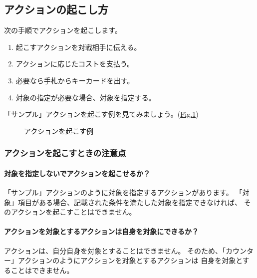 \documentclass[letterpaper,10pt,dvipdfmx]{sphinxmanual}
\begin{document}
\subsection{アクションの起こし方}
\label{\detokenize{common/common:id20}}
\sphinxAtStartPar
次の手順でアクションを起こします。
\begin{enumerate}
%
\item {} 
\sphinxAtStartPar
起こすアクションを対戦相手に伝える。

\item {} 
\sphinxAtStartPar
アクションに応じたコストを支払う。

\item {} 
\sphinxAtStartPar
必要なら手札からキーカードを出す。

\item {} 
\sphinxAtStartPar
対象の指定が必要な場合、対象を指定する。

\end{enumerate}

\sphinxAtStartPar
「サンプル」アクションを起こす例を見てみましょう。(\hyperref[\detokenize{common/common:action-sample2}]{Fig.\@ \ref{\detokenize{common/common:action-sample2}}})

\begin{figure}[htbp]
\centering
\capstart

\noindent{}
\caption{アクションを起こす例}\label{\detokenize{common/common:id55}}\label{\detokenize{common/common:action-sample2}}\end{figure}


\subsubsection{アクションを起こすときの注意点}
\label{\detokenize{common/common:id21}}

\paragraph{対象を指定しないでアクションを起こせるか？}
\label{\detokenize{common/common:id22}}
\sphinxAtStartPar
「サンプル」アクションのように対象を指定するアクションがあります。
「対象」項目がある場合、記載された条件を満たした対象を指定できなければ、
そのアクションを起こすことはできません。


\paragraph{アクションを対象とするアクションは自身を対象にできるか？}
\label{\detokenize{common/common:id23}}
\sphinxAtStartPar
アクションは、自分自身を対象とすることはできません。
そのため、「カウンター」アクションのようにアクションを対象とするアクションは
自身を対象とすることはできません。
\end{document}
